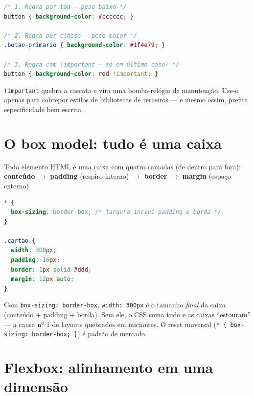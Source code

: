 \begin{lstlisting}[style=livro, language=CSS,
  caption={Cascata e especificidade na prática.}, label={list:css-cascata}]
/* 1. Regra por tag — peso baixo */
button { background-color: #cccccc; }

/* 2. Regra por classe — peso maior */
.botao-primario { background-color: #1f4e79; }

/* 3. Regra com !important — só em último caso! */
button { background-color: red !important; }
\end{lstlisting}

\begin{caixaarmadilha}
\texttt{!important} quebra a cascata e vira uma bomba-relógio de manutenção.
Use-o apenas para sobrepor estilos de bibliotecas de terceiros — e mesmo assim,
prefira especificidade bem escrita.
\end{caixaarmadilha}

\section{O box model: tudo é uma caixa}

Todo elemento HTML é uma caixa com quatro camadas (de dentro para fora):
\textbf{conteúdo} $\rightarrow$ \textbf{padding} (respiro interno)
$\rightarrow$ \textbf{border} $\rightarrow$ \textbf{margin} (espaço externo).

\begin{lstlisting}[style=livro, language=CSS,
  caption={Box model com \texttt{box-sizing: border-box}.}, label={list:css-box}]
* {
  box-sizing: border-box; /* largura inclui padding e borda */
}

.cartao {
  width: 300px;
  padding: 16px;
  border: 1px solid #ddd;
  margin: 12px auto;
}
\end{lstlisting}

\begin{caixaconceito}
Com \texttt{box-sizing: border-box}, \texttt{width: 300px} é o tamanho
\emph{final} da caixa (conteúdo + padding + borda). Sem ele, o CSS soma tudo e
as caixas ``estouram'' — a causa nº 1 de layouts quebrados em iniciantes.
O reset universal (\texttt{* \{ box-sizing: border-box; \}}) é padrão de mercado.
\end{caixaconceito}

\section{Flexbox: alinhamento em uma dimensão}

